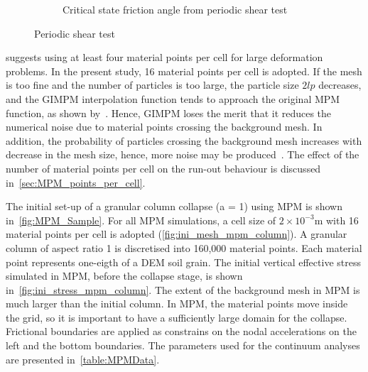 \begin{figure}
\begin{subfigure}[b]{0.575\textwidth}
\caption{Critical state friction angle from periodic shear test}
\label{fig:Sxy_vs_Syy}
\end{subfigure} 
\caption{Periodic shear test}
\label{fig:shear_test}
\end{figure}

\citet{Guilkey2003} suggests using at least four material points per cell for 
large deformation problems. In the present study, 16 material points 
per cell is adopted. If the mesh is too fine and the number of particles is too 
large, the particle size $2lp$ decreases, and the GIMPM interpolation 
function tends to approach the original MPM function, as shown 
by~\citet{Bardenhagen2004}. Hence, GIMPM loses the merit that it reduces the 
numerical noise due to material points crossing the background mesh. In 
addition, the probability of particles crossing the background mesh increases 
with decrease in the mesh size, hence, more noise may be 
produced~\citep{Abe2013}. The effect of the number of material points per cell 
on the run-out behaviour is discussed in~\cref{sec:MPM_points_per_cell}.

The initial set-up of a granular column collapse (a = 1) using MPM is shown 
in~\cref{fig:MPM_Sample}. For all MPM simulations, a cell size of 
$2\times10^{-3}\si{\m}$ with 16 material points per cell is adopted 
(\cref{fig:ini_mesh_mpm_column}). A granular column of aspect ratio 1 is 
discretised into 160,000 material points. Each material point represents 
one-eigth of a DEM soil grain. The initial vertical effective stress simulated 
in MPM, before the collapse stage, is shown 
in~\cref{fig:ini_stress_mpm_column}. The extent of the 
background mesh in MPM is much larger than the initial column. In MPM, the 
material points move inside the grid, so it is important to have a sufficiently 
large domain for the collapse. Frictional boundaries are applied as constrains 
on the nodal accelerations on the left and the bottom boundaries. The 
parameters used for the continuum analyses are presented 
in~\cref{table:MPMData}. 

